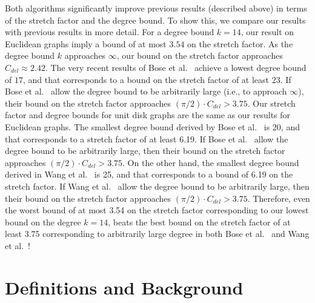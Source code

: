 \documentclass{stacs_proc}
\theoremstyle{plain}\newtheorem{satz}[thm]{Satz}
\begin{document}
Both algorithms significantly improve previous results (described above)
in terms of the stretch factor and the degree bound. To show this, we compare
our results with previous results in more detail. For a degree bound $k=14$,
our result on Euclidean graphs imply a bound of at most $3.54$ on the stretch
factor. As the degree bound $k$ approaches $\infty$, our bound on the
stretch factor approaches $C_{del} \approx 2.42$. The very recent
results of Bose et al.~\cite{bose1} achieve a lowest degree bound of
$17$, and that corresponds to a bound on the stretch factor of at
least $23$. If Bose et al.~\cite{bose1} allow the degree bound to be
arbitrarily large (i.e., to approach $\infty$), their bound on the
stretch factor approaches $(\pi/2) \cdot C_{del} > 3.75$. Our stretch factor
and degree bounds for unit disk graphs are the same as our results
for Euclidean graphs. The smallest
degree bound derived by Bose et al.~\cite{bose1} is 20, and that
corresponds to a stretch factor of at least 6.19. If Bose et
al.~\cite{bose1} allow the degree bound to be arbitrarily large,
then their bound on the stretch factor approaches $(\pi/2) \cdot
C_{del} > 3.75$. On the other hand, the smallest degree bound derived in
Wang et al.~\cite{iitbounded1,iitbounded} is 25, and that
corresponds to a bound of 6.19 on the stretch factor. If Wang et
al.~\cite{iitbounded1,iitbounded} allow the degree bound to be
arbitrarily large, then their bound on the stretch factor approaches
$(\pi/2) \cdot C_{del} > 3.75$. Therefore, even the worst bound of
at most 3.54 on the stretch factor corresponding to our lowest bound
on the degree $k=14$, beats the best bound on the stretch factor of
at least 3.75 corresponding to arbitrarily large degree in both Bose
et al.~\cite{bose1} and Wang et al.~\cite{iitbounded1,iitbounded}!


\section{Definitions and Background}
\label{background}
\end{document}
